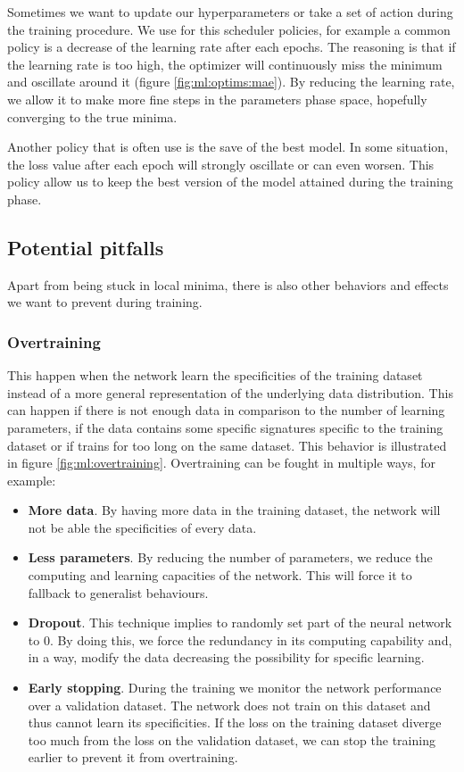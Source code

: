 \documentclass[../main.tex]{subfiles}
\begin{document}
Sometimes we want to update our hyperparameters or take a set of action during the training procedure. We use for this scheduler policies, for example a common policy is a decrease of the learning rate after each epochs. The reasoning is that if the learning rate is too high, the optimizer will continuously miss the minimum and oscillate around it (figure \ref{fig:ml:optims:mae}). By reducing the learning rate, we allow it to make more fine steps in the parameters phase space, hopefully converging to the true minima.

Another policy that is often use is the save of the best model. In some situation, the loss value after each epoch will strongly oscillate or can even worsen. This policy allow us to keep the best version of the model attained during the training phase.

\subsection{Potential pitfalls}
\label{sec:ml:pitfall}

Apart from being stuck in local minima, there is also other behaviors and effects we want to prevent during training.

\subsubsection{Overtraining}
This happen when the network learn the specificities of the training dataset instead of a more general representation of the underlying data distribution. This can happen if there is not enough data in comparison to the number of learning parameters, if the data contains some specific signatures specific to the training dataset or if trains for too long on the same dataset. This behavior is illustrated in figure \ref{fig:ml:overtraining}. Overtraining can be fought in multiple ways, for example:
\begin{itemize}
  \item \textbf{More data}. By having more data in the training dataset, the network will not be able the specificities of every data.
  \item \textbf{Less parameters}. By reducing the number of parameters, we reduce the computing and learning capacities of the network. This will force it to fallback to generalist behaviours.
  \item \textbf{Dropout}. This technique implies to randomly set part of the neural network to 0. By doing this, we force the redundancy in its computing capability and, in a way, modify the data decreasing the possibility for specific learning.
  \item \textbf{Early stopping}. During the training we monitor the network performance over a validation dataset. The network does not train on this dataset and thus cannot learn its specificities. If the loss on the training dataset diverge too much from the loss on the validation dataset, we can stop the training earlier to prevent it from overtraining.
\end{itemize}
\end{document}
